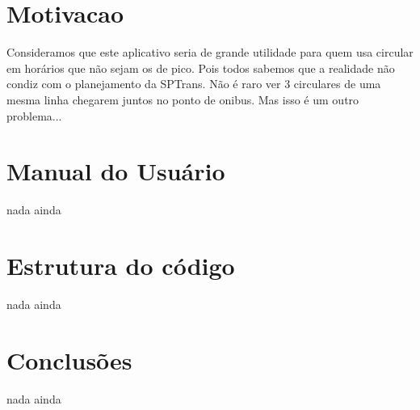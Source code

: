 




\cabecalho

\section{Motivacao}
Consideramos que este aplicativo seria de grande utilidade para quem usa
circular em horários que não sejam os de pico. Pois todos sabemos que a
realidade não condiz com o planejamento da SPTrans. Não é raro ver
3 circulares de uma mesma linha chegarem juntos no ponto de onibus. Mas
isso é um outro problema...

\section{Manual do Usuário}
nada ainda

\section{Estrutura do código}
nada ainda

\section{Conclusões}
nada ainda


